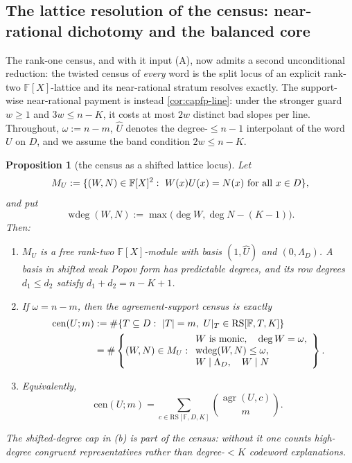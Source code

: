 \documentclass[11pt]{article}
\newtheorem{proposition}[proposition]{Proposition}
\theoremstyle{definition}
\theoremstyle{remark}
\newcommand{\F}{\mathbb{F}}
\newcommand{\RS}{\mathrm{RS}}
\begin{document}
\subsection{The lattice resolution of the census: near-rational dichotomy and the balanced core}

The rank-one census, and with it input \textup{(A)}, now admits a second unconditional reduction: the twisted census of \emph{every} word is the split locus of an explicit rank-two $\F[X]$-lattice and its near-rational stratum resolves exactly.  The support-wise near-rational payment is instead \cref{cor:capfp-line}: under the stronger guard $w\ge1$ and $3w\le n-K$, it costs at most $2w$ distinct bad slopes per line.  Throughout, $\omega:=n-m$, $\widehat U$ denotes the degree-$\le n-1$ interpolant of the word $U$ on $D$, and we assume the band condition $2w\le n-K$.


\begin{proposition}[the census as a shifted lattice locus]\label{prop:capfp-lattice}
Let
\[
        M_U:=\{(W,N)\in\F[X]^2:\ W(x)U(x)=N(x)\ \textup{for all }x\in D\},
\]
and put
\[
        \operatorname{wdeg}(W,N):=\max\bigl(\deg W,\deg N-(K-1)\bigr).
\]
Then:
\begin{enumerate}[label=\textup{(\alph*)}]
\item $M_U$ is a free rank-two $\F[X]$-module with basis
$(1,\widehat U)$ and $(0,\Lambda_D)$.  A basis in shifted weak Popov
form has predictable degrees, and its row degrees $d_1\le d_2$ satisfy
$d_1+d_2=n-K+1$.
\item If $\omega=n-m$, then the agreement-support census is exactly
\[
\begin{aligned}
\mathrm{cen}(U;m)
&:=\#\{T\subseteq D:\ |T|=m,\ U|_T\in \RS[\F,T,K]\}\\
&=\#\left\{(W,N)\in M_U:
\begin{array}{l}
W\textup{ is monic},\quad \deg W=\omega,\\
\operatorname{wdeg}(W,N)\le\omega,\\
W\mid\Lambda_D,\quad W\mid N
\end{array}
\right\}.
\end{aligned}
\]
\item Equivalently,
\[
        \mathrm{cen}(U;m)=\sum_{c\in \RS[\F,D,K]}\binom{\operatorname{agr}(U,c)}m.
\]
\end{enumerate}
The shifted-degree cap in \textup{(b)} is part of the census: without it one
counts high-degree congruent representatives rather than degree-$<K$ codeword
explanations.
\end{proposition}
\end{document}
